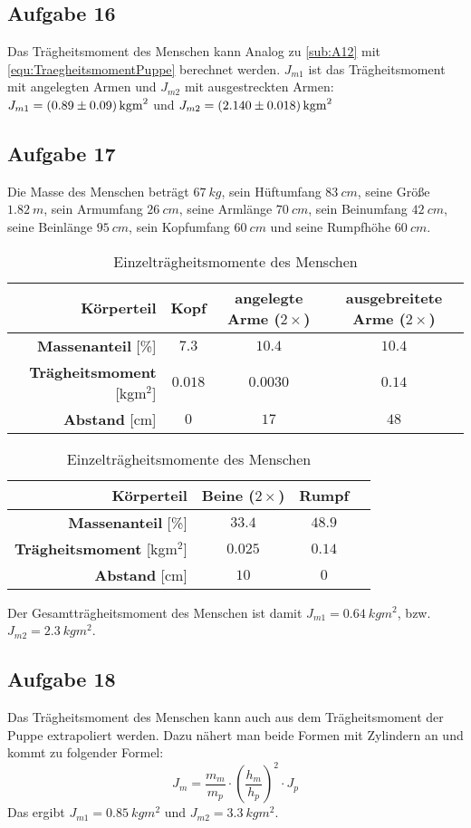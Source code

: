 \documentclass[a4paper, 11pt, ngerman]{scrartcl}
\begin{document}
\subsection{Aufgabe 16}
Das Trägheitsmoment des Menschen kann Analog zu \cref{sub:A12} mit \cref{equ:TraegheitsmomentPuppe} berechnet werden. $J_{m1}$ ist das Trägheitsmoment mit angelegten Armen und $J_{m2}$ mit ausgestreckten Armen: $J_{m1} = \SI{0.89 \pm 0.09}{kgm^2}$ und $J_{m2} = \SI{2.14 \pm 0.018}{kgm^2}$

\subsection{Aufgabe 17}
Die Masse des Menschen beträgt $\SI{67}{kg}$, sein Hüftumfang $\SI{83}{cm}$, seine Größe $\SI{1.82}{m}$, sein Armumfang $\SI{26}{cm}$, seine Armlänge $\SI{70}{cm}$, sein Beinumfang $\SI{42}{cm}$, seine Beinlänge $\SI{95}{cm}$, sein Kopfumfang $\SI{60}{cm}$ und seine Rumpfhöhe $\SI{60}{cm}$.
\begin{table}[ht]
\begin{center}\label{tab:Einzeltraegheitsmomente}
\begin{tabular}{r|ccc}\hline
\textbf{Körperteil} & Kopf & angelegte Arme ($2\times$) & ausgebreitete Arme ($2\times$) \\
\hline
\textbf{Massenanteil} [\%] & $7.3$ & $10.4$ & $10.4$ \\
\textbf{Trägheitsmoment} [kgm$^2$] & $0.018$ & $0.0030$ & $0.14$ \\
\textbf{Abstand} [cm] & $0$ & $17$ & $48$ \\
\hline\end{tabular}
\begin{tabular}{r|ccc}\hline
\textbf{Körperteil} & Beine ($2\times$) & Rumpf \\
\hline
\textbf{Massenanteil} [\%] & $33.4$ & $48.9$ \\
\textbf{Trägheitsmoment} [kgm$^2$] & $0.025$ & $0.14$ \\
\textbf{Abstand} [cm] & $10$ & $0$ \\
\hline\end{tabular}
\caption{Einzelträgheitsmomente des Menschen}
\end{center}
\end{table}

Der Gesamtträgheitsmoment des Menschen ist damit $J_{m1} = \SI{0.64}{kgm^2}$, bzw. $J_{m2} = \SI{2.3}{kgm^2}$.

\subsection{Aufgabe 18}
Das Trägheitsmoment des Menschen kann auch aus dem Trägheitsmoment der Puppe extrapoliert werden. Dazu nähert man beide Formen mit Zylindern an und kommt zu folgender Formel:
\begin{equation}
J_m = \frac{m_m}{m_p} \cdot \left(\frac{h_m}{h_p}\right)^2 \cdot J_p
\end{equation}
Das ergibt $J_{m1} = \SI{0.85}{kgm^2}$ und $J_{m2} = \SI{3.3}{kgm^2}$.
\end{document}
